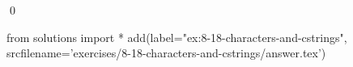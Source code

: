 
\begin{ex}
  \label{ex:8-18-characters-and-cstrings}
  
  \qed
\end{ex}
\begin{python0}
from solutions import *
add(label="ex:8-18-characters-and-cstrings",
    srcfilename='exercises/8-18-characters-and-cstrings/answer.tex')
\end{python0}
